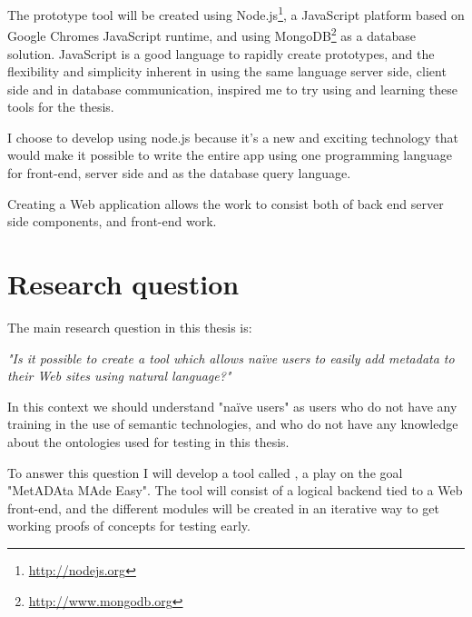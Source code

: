 The prototype tool will be created using Node.js\footnote{\url{http://nodejs.org}},
a JavaScript platform based on Google Chromes JavaScript runtime,
and using MongoDB\footnote{\url{http://www.mongodb.org}} as a database solution.
JavaScript is a good language to rapidly create prototypes, and the flexibility and simplicity inherent in using the same language
server side, client side and in database communication, inspired me to try using and learning these tools for the thesis.

%

I choose to develop using node.js because it's a new and exciting technology that would make it possible to write
the entire app using one programming language for front-end, server side and as the database query language.

Creating a Web application allows the work to consist both of back end server side components, and front-end work.


\section{Research question}
The main research question in this thesis is:

\emph{"Is it possible to create a tool which allows naïve users to easily add metadata to their Web sites using natural language?"}

In this context we should understand "naïve users" as users who do not have any training in the use of semantic technologies,
and who do not have any knowledge about the ontologies used for testing in this thesis.

To answer this question I will develop a tool called \theartefact, a play on the goal "MetADAta MAde Easy".
The tool will consist of a logical backend tied to a Web front-end,
and the different modules will be created in an iterative way to get working proofs of concepts for testing early.

